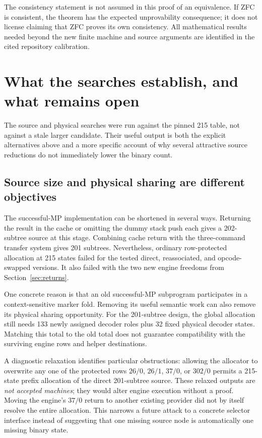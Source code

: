 \documentclass[11pt]{article}
\theoremstyle{definition}
\begin{document}
The consistency statement is not assumed in this proof of an equivalence.
If ZFC is consistent, the theorem has the expected unprovability
consequence; it does not license claiming that ZFC proves its own
consistency. All mathematical results needed beyond the new finite machine
and source arguments are identified in the cited repository calibration.




\section{What the searches establish, and what remains open}
\label{sec:search}

The source and physical searches were run against the pinned 215 table,
not against a stale larger candidate. Their useful output is both the
explicit alternatives above and a more specific account of why several
attractive source reductions do not immediately lower the binary count.

\subsection{Source size and physical sharing are different objectives}

The successful-MP implementation can be shortened in several ways.
Returning the result in the cache or omitting the dummy stack push each
gives a 202-subtree source at this stage. Combining cache return with the
three-command transfer system gives 201 subtrees. Nevertheless, ordinary
row-protected allocation at 215 states failed for the tested direct,
reassociated, and opcode-swapped versions. It also failed with the two new
engine freedoms from Section~\ref{sec:returns}.

One concrete reason is that an old successful-MP subprogram participates
in a context-sensitive marker fold. Removing its useful semantic work can
also remove its physical sharing opportunity. For the 201-subtree design,
the global allocation still needs 133 newly assigned decoder roles plus
32 fixed physical decoder states. Matching this total to the old total
does not guarantee compatibility with the surviving engine rows and
helper destinations.

A diagnostic relaxation identifies particular obstructions: allowing the
allocator to overwrite any one of the protected rows \(26/0\), \(26/1\),
\(37/0\), or \(302/0\) permits a 215-state prefix allocation of the direct 201-subtree
source. These relaxed outputs are \emph{not accepted machines}; they would
alter engine execution without a proof. Moving the engine's \(37/0\)
return to another existing provider did not by itself resolve the entire
allocation. This narrows a future attack to a concrete selector interface
instead of suggesting that one missing source node is automatically one
missing binary state.
\end{document}
